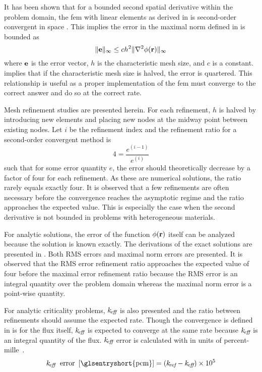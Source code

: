   It has been shown that for a bounded second spatial derivative 
  within the problem domain, the \gls{fem} with linear elements as derived in 
   is second-order convergent in space 
  \cite{textbookli}. This implies the error in the maximal norm defined in 
   is bounded as
  \begin{equation} 
    \label{eq:error_bound}
    \|\mathbf{e}\|_{\infty} \le c h^2 \| \mathbf{\nabla}^2 \phi(\mathbf{r}) \|_{\infty}
  \end{equation}
  where $\mathbf{e}$ is the error vector, $h$ is the characteristic mesh size, and $c$
  is a constant.  implies that if the characteristic mesh 
  size is halved, the error is quartered. This relationship is useful as a 
  proper implementation of the \gls{fem} must converge to the correct answer and 
  do so at the correct rate.
  
  Mesh refinement studies are presented herein. For each refinement, $h$ is 
  halved by introducing new elements and placing new nodes at the midway point
  between existing nodes. Let $i$ be the refinement index and the refinement 
  ratio for a second-order convergent method is 
  \begin{equation}
    4 = \frac{e^{(i-1)}}{e^{(i)}}
  \end{equation}
  such that for some error quantity $e$, the error should theoretically decrease 
  by a factor of four for each refinement. As these are numerical solutions, the
  ratio rarely equals exactly four. It is observed that a few refinements are
  often necessary before the convergence reaches the asymptotic regime and the
  ratio approaches the expected value. This is especially the case when the
  second derivative is not bounded in problems with heterogeneous materials.
  
  For analytic solutions, the error of the function $\phi(\mathbf{r})$ itself can be 
  analyzed because the solution is known exactly. The derivations of the exact 
  solutions are presented in . Both RMS errors and
  maximal norm errors are presented. It is observed that the RMS error
  refinement ratio approaches the expected value of four before the maximal
  error refinement ratio because the RMS error is an integral quantity over the
  problem domain whereas the maximal norm error is a point-wise quantity.

  For analytic criticality  problems, $k_{\!\mbox{\scriptsize \em eff}}$ is also presented and the ratio
  between refinements should assume the expected rate. Though the convergence is
  defined in  is for the flux itself, $k_{\!\mbox{\scriptsize \em eff}}$ is expected
  to  converge at the same rate because $k_{\!\mbox{\scriptsize \em eff}}$ is an integral quantity of the
  flux. $k_{\!\mbox{\scriptsize \em eff}}$ error is calculated with  in units of
  percent-mille~.
  \begin{equation}
    \label{eq:keff_err}
    \keff \; \text{ error } \units{\glsentryshort{pcm}} = (\kref - \keff) 
      \times 10^5
  \end{equation}


